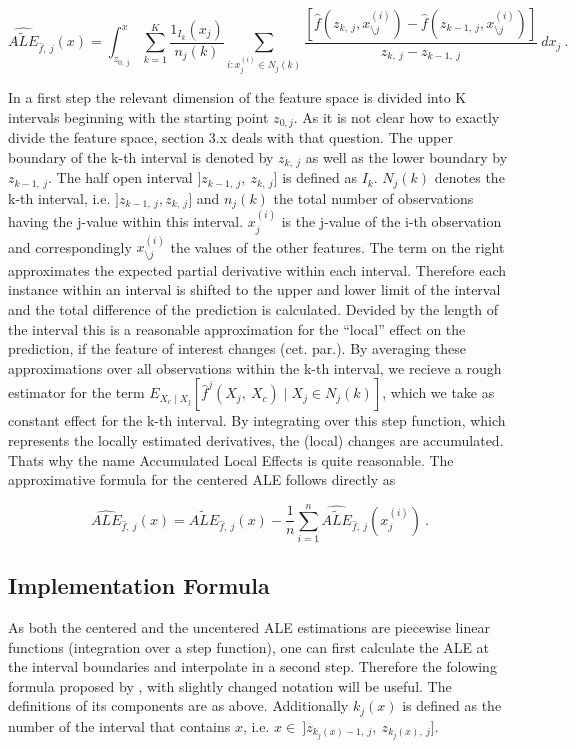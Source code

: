 \documentclass[]{krantz}
\begin{document}
\[ \widehat{\widetilde{ALE}}_{\hat{f},~j}(x) = \int_{z_{0,~j}}^{x} \sum_{k=1}^{K}    \frac{1_{I_k}(x_j)}{n_j(k)}\sum_{i:x_j^{(i)}\in N_j(k)} \frac{[\hat{f}(z_{k,~j}, x_{\setminus j}^{(i)})-\hat{f}(z_{k-1,~j}, x_{\setminus j}^{(i)})]}{z_{k,~j}-z_{k-1,~j}}~dx_j~.  \]

In a first step the relevant dimension of the feature space is divided
into K intervals beginning with the starting point \(z_{0, j}\). As it
is not clear how to exactly divide the feature space, section 3.x deals
with that question. The upper boundary of the k-th interval is denoted
by \(z_{k, ~j}\) as well as the lower boundary by \(z_{k-1, ~j}\). The
half open interval \(]z_{k-1,~j},~z_{k,~j}]\) is defined as \(I_k\).
\(N_j(k)\) denotes the k-th interval, i.e. \(]z_{k-1,~j}, z_{k,~j}]\)
and \(n_j(k)\) the total number of observations having the j-value
within this interval. \(x_j^{(i)}\) is the j-value of the i-th
observation and correspondingly \(x_{\setminus j}^{(i)}\) the values of
the other features. The term on the right approximates the expected
partial derivative within each interval. Therefore each instance within
an interval is shifted to the upper and lower limit of the interval and
the total difference of the prediction is calculated. Devided by the
length of the interval this is a reasonable approximation for the
``local'' effect on the prediction, if the feature of interest changes
(cet. par.). By averaging these approximations over all observations
within the k-th interval, we recieve a rough estimator for the term
\(E_{X_c \mid X_j} [\hat{f}^j(X_j,~X_c)\mid X_j \in N_j(k)]\), which we
take as constant effect for the k-th interval. By integrating over this
step function, which represents the locally estimated derivatives, the
(local) changes are accumulated. Thats why the name Accumulated Local
Effects is quite reasonable. The approximative formula for the centered
ALE follows directly as

\[ \widehat{ALE}_{\hat{f},~j}(x) = \widehat{\widetilde{ALE}}_{\hat{f},~j}(x) - \frac{1}{n} \sum_{i=1}^{n} \widehat{\widetilde{ALE}}_{\hat{f},~j}(x_j^{(i)})~. 
 \]

\subsection{Implementation Formula}\label{implementation-formula}

As both the centered and the uncentered ALE estimations are piecewise
linear functions (integration over a step function), one can first
calculate the ALE at the interval boundaries and interpolate in a second
step. Therefore the folowing formula proposed by \citep[page
11]{Apley2016} , with slightly changed notation will be useful. The
definitions of its components are as above. Additionally \(k_j(x)\) is
defined as the number of the interval that contains \(x\), i.e.
\(x \in ~]z_{k_j(x)-1,~j},~z_{k_j(x),~j}]\).
\end{document}
